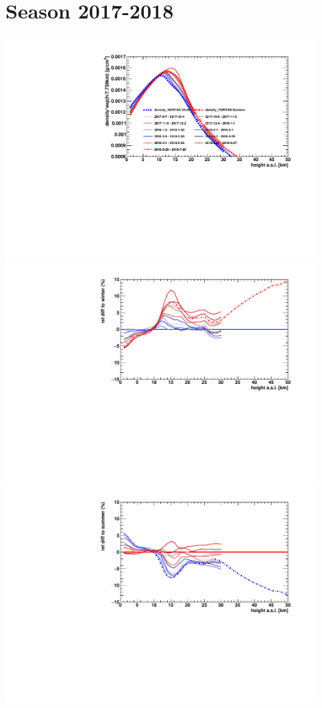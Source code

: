 \section*{Season 2017-2018}
\noindent\begin{minipage}{\textwidth}
\centering
\includegraphics[width=0.9\textwidth]{season-2017-2018-density.pdf}
\includegraphics[width=0.9\textwidth]{season-relativeWinter-2017-2018-density.pdf}
\includegraphics[width=0.9\textwidth]{season-relativeSummer-2017-2018-density.pdf}
\end{minipage}
